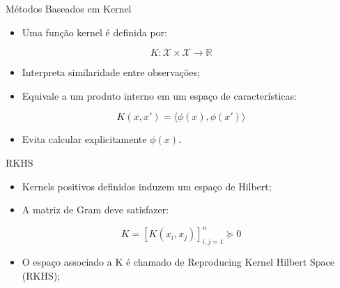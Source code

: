 \documentclass[aspectratio=169,t,xcolor=table]{beamer}
\begin{document}


\begin{frame}{Métodos Baseados em Kernel}

\begin{itemize}
\item Uma função kernel é definida por:
\end{itemize}

$$
K: \mathcal{X}\times\mathcal{X}\to\mathbb{R}
$$

\vspace{0.3cm}

\begin{itemize}
\item Interpreta similaridade entre observações;

\vspace{0.2cm}

\item Equivale a um produto interno em um espaço de características:

\end{itemize}

$$
K(x,x')=\langle \phi(x),\phi(x')\rangle
$$

\vspace{0.3cm}

\begin{itemize}
\item Evita calcular explicitamente $\phi(x)$.
\end{itemize}

\end{frame}

\begin{frame}{RKHS}

\begin{itemize}
\item Kernels positivos definidos induzem um espaço de Hilbert;

\vspace{0.3cm}

\item A matriz de Gram deve satisfazer:

\end{itemize}

$$
K=[K(x_i,x_j)]_{i,j=1}^n \succeq 0
$$

\vspace{0.3cm}

\begin{itemize}
\item O espaço associado a K é chamado de Reproducing Kernel Hilbert Space (RKHS);
\end{itemize}


\end{frame}
\end{document}
